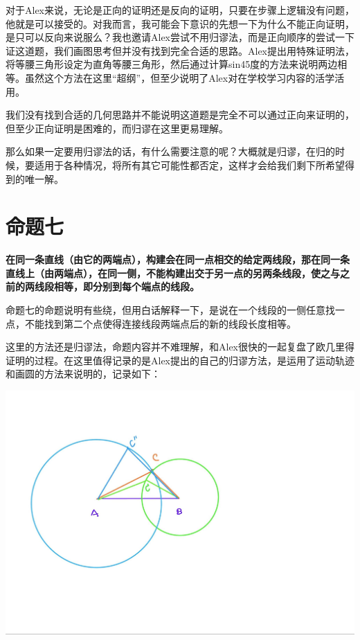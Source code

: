 \documentclass[
]{book}
\begin{document}
对于Alex来说，无论是正向的证明还是反向的证明，只要在步骤上逻辑没有问题，他就是可以接受的。对我而言，我可能会下意识的先想一下为什么不能正向证明，是只可以反向来说服么？我也邀请Alex尝试不用归谬法，而是正向顺序的尝试一下证这道题，我们画图思考但并没有找到完全合适的思路。Alex提出用特殊证明法，将等腰三角形设定为直角等腰三角形，然后通过计算sin45度的方法来说明两边相等。虽然这个方法在这里``超纲''，但至少说明了Alex对在学校学习内容的活学活用。

我们没有找到合适的几何思路并不能说明这道题是完全不可以通过正向来证明的，但至少正向证明是困难的，而归谬在这里更易理解。

那么如果一定要用归谬法的话，有什么需要注意的呢？大概就是归谬，在归的时候，要适用于各种情况，将所有其它可能性都否定，这样才会给我们剩下所希望得到的唯一解。

\hypertarget{ux547dux9898ux4e03}{%
\section{命题七}\label{ux547dux9898ux4e03}}

\textbf{在同一条直线（由它的两端点），构建会在同一点相交的给定两线段，那在同一条直线上（由两端点），在同一侧，不能构建出交于另一点的另两条线段，使之与之前的两线段相等，即分别到每个端点的线段。}

命题七的命题说明有些绕，但用白话解释一下，是说在一个线段的一侧任意找一点，不能找到第二个点使得连接线段两端点后的新的线段长度相等。

这里的方法还是归谬法，命题内容并不难理解，和Alex很快的一起复盘了欧几里得证明的过程。在这里值得记录的是Alex提出的自己的归谬方法，是运用了运动轨迹和画圆的方法来说明的，记录如下：

\includegraphics[width=1\linewidth]{./image/06-prop7-image6}
\end{document}
